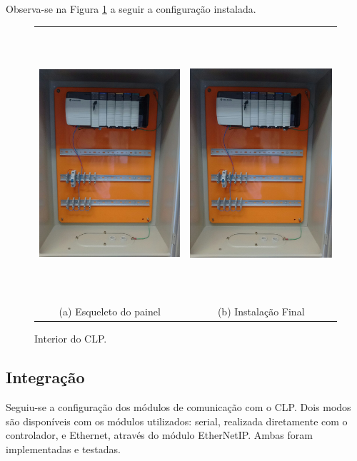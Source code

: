 Observa-se na Figura \ref{fig:modulos} a seguir a configuração instalada.
\begin{figure}[H]
	\centering
	\begin{tabular}{cc}
		\includegraphics[height=10cm,keepaspectratio]{figs/modulos.jpg} &
		\includegraphics[height=10cm,keepaspectratio]{figs/modulos.jpg} \\
		(a) Esqueleto do painel &
		(b) Instalação Final
	\end{tabular}
	\caption{\label{fig:modulos} Interior do CLP.}
\end{figure}

\subsection{Integração}
Seguiu-se a configuração dos módulos de comunicação com o CLP. Dois modos são disponíveis com os módulos utilizados: serial, realizada diretamente com o controlador, e Ethernet, através do módulo EtherNetIP. Ambas foram implementadas e testadas.

